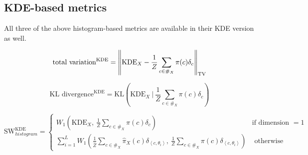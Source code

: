\subsection{KDE-based metrics}

All three of the above histogram-based metrics are available in their KDE version as well. 

\[\text{total variation}^{\text{KDE}} = \norm{\text{KDE}_X - \frac 1 Z \sum_{c \in \#_X} \pi(c) \delta_c}_{\text{TV}} \]

\[\text{KL divergence}^{\text{KDE}} = \text{KL} \left(\text{KDE}_X \ \bigg|\  \frac 1 Z \sum_{c \in \#_X} \pi(c) \delta_c\right) \]

\[\text{SW}_{histogram}^{\text{KDE}} = \begin{cases}
W_1 \left( \text{KDE}_X,\  \frac 1 Z \sum_{c \in \#_X} \pi(c) \delta_c \right) & \text{if dimension } = 1 \\
\sum_{i = 1}^L W_1 \left( \frac 1 {\hat Z} \sum_{c \in \#_X} \hat{\pi}_X(c) \delta_{\left<c, \theta_i \right>},\  \frac 1 Z \sum_{c \in \#_X} \pi(c) \delta_{\left<c, \theta_i \right>}  \right) & \text{ otherwise }
\end{cases}\]